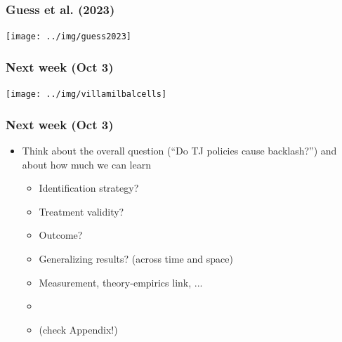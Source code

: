 \documentclass[aspectratio=43]{beamer}
\begin{document}
\begin{frame}
\frametitle{Guess et al. (2023)}
\centering

\texttt{[image: ../img/guess2023]}

\end{frame}

\begin{frame}
\frametitle{Next week (Oct 3)}
\centering

\texttt{[image: ../img/villamilbalcells]}

\end{frame}

\begin{frame}
\frametitle{Next week (Oct 3)}
\centering

\begin{itemize}
  \item Think about the overall question (``Do TJ policies cause backlash?'') and about how much we can learn
  \begin{itemize}
    \item Identification strategy?
    \item Treatment validity?
    \item Outcome?
    \item Generalizing results? (across time and space)
    \item Measurement, theory-empirics link, ...
    \item[]
    \item[] (check Appendix!)
  \end{itemize}
\end{itemize}

\end{frame}


\end{document}
